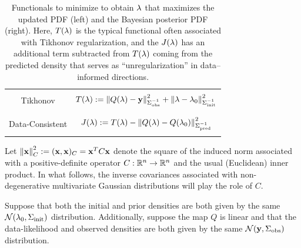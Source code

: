 

\begin{table}[htbp]
\centering
\begin{tabular}{|c|c|}
\hline
  & \\
  Tikhonov & $T(\lambda):=\left\Vert Q(\lambda)-\mathbf{y}\right\Vert_{\Sigma_\text{obs}^{-1}}^2 +
      \left\Vert\lambda-\lambda_0\right\Vert_{\Sigma_\text{init}^{-1}}^2$
  \\ & \\ \hline & \\
  Data-Consistent & $J(\lambda):=T(\lambda) - \left\Vert Q(\lambda)-Q(\lambda_0)\right\Vert_{\Sigma_\text{pred}^{-1}}^2$
  \\ & \\
  \hline
\end{tabular}
\caption{Functionals to minimize to obtain $\lambda$ that maximizes  the updated PDF (left) and the Bayesian posterior PDF (right).
Here, $T(\lambda)$ is the typical functional often associated with Tikhonov regularization, and the $J(\lambda)$ has an additional term subtracted from $T(\lambda)$ coming from the predicted density that serves as ``unregularization'' in data--informed directions.}
  \label{tab:func_comparisons}
\end{table}

Let $\left\Vert\mathbf{x}\right\Vert_C^2 := (\mathbf{x}, \mathbf{x})_C = \mathbf{x}^T C \mathbf{x} $ denote the square of the induced norm associated with a positive-definite operator $C : \mathbb{R}^n \to \mathbb{R}^n$ and the usual (Euclidean) inner product.
In what follows, the inverse covariances associated with non-degenerative multivariate Gaussian distributions will play the role of $C$.
%

Suppose that both the initial and prior densities are both given by the same $\mathcal{N}(\lambda_0, \Sigma_\text{init})$ distribution.
Additionally, suppose the map $Q$ is linear and that the data-likelihood and observed densities are both given by the same $\mathcal{N}(\mathbf{y}, \Sigma_\text{obs})$ distribution.

